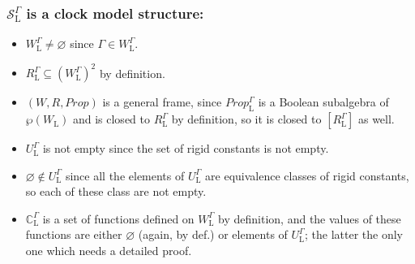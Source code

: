 \documentclass[xcolor=x11names]{beamer}
\begin{document}
\begin{frame}[t]
	\frametitle{$\mathcal S_{\mathrm{L}}^\Gamma$ is a clock model structure:}
\footnotesize

\begin{itemize}\footnotesize
\item $W_\mathrm{L}^\Gamma \neq \varnothing$ since $\Gamma \in W_\mathrm{L}^\Gamma$.
\pause
\item $R_\mathrm{L}^\Gamma \subseteq  (W_\mathrm{L}^\Gamma)^2$ by definition.
\pause
\item $(W, R, Prop)$ is a general frame, since $Prop_{\mathrm{L}}^\Gamma$ is a Boolean subalgebra of $\wp (W_\mathrm{L})$ and is closed to $R_{\mathrm{L}}^\Gamma$ by definition, so it is closed to $[R_{\mathrm{L}}^\Gamma]$ as well.
\pause
\item $U_{\mathrm{L}}^\Gamma$ is not empty since the set of rigid constants is not empty.
\pause
\item $\varnothing \notin U_{\mathrm{L}}^\Gamma$ since all the elements of $U_{\mathrm{L}}^\Gamma$ are equivalence classes of rigid constants, so each of these class are not empty.
\pause
\item $\mathbb C_{\mathrm{L}}^\Gamma$ is a set of functions defined on $W_\mathrm{L}^\Gamma$ by definition, and the values of these functions are either $\varnothing$ (again, by def.) or elements of $U_{\mathrm{L}}^\Gamma$; the latter the only one which needs a detailed proof.
\end{itemize}

\end{frame}
\end{document}
